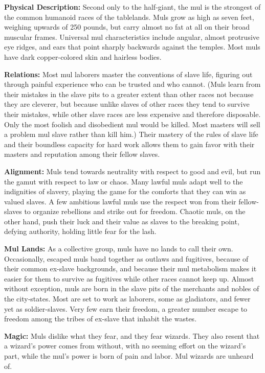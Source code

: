 \textbf{Physical Description:} Second only to the half‐giant, the mul is the strongest of the common humanoid races of the tablelands. Muls grow as high as seven feet, weighing upwards of 250 pounds, but carry almost no fat at all on their broad muscular frames. Universal mul characteristics include angular, almost protrusive eye ridges, and ears that point sharply backwards against the temples. Most muls have dark copper-colored skin and hairless bodies.

\textbf{Relations:} Most mul laborers master the conventions of slave life, figuring out through painful experience who can be trusted and who cannot. (Muls learn from their mistakes in the slave pits to a greater extent than other races not because they are cleverer, but because unlike slaves of other races they tend to survive their mistakes, while other slave races are less expensive and therefore disposable. Only the most foolish and disobedient mul would be killed. Most masters will sell a problem mul slave rather than kill him.) Their mastery of the rules of slave life and their boundless capacity for hard work allows them to gain favor with their masters and reputation among their fellow slaves.

\textbf{Alignment:} Muls tend towards neutrality with respect to good and evil, but run the gamut with respect to law or chaos. Many lawful muls adapt well to the indignities of slavery, playing the game for the comforts that they can win as valued slaves. A few ambitious lawful muls use the respect won from their fellow-slaves to organize rebellions and strike out for freedom. Chaotic muls, on the other hand, push their luck and their value as slaves to the breaking point, defying authority, holding little fear for the lash.

\textbf{Mul Lands:} As a collective group, muls have no lands to call their own. Occasionally, escaped muls band together as outlaws and fugitives, because of their common ex-slave backgrounds, and because their mul metabolism makes it easier for them to survive as fugitives while other races cannot keep up. Almost without exception, muls are born in the slave pits of the merchants and nobles of the city‐states. Most are set to work as laborers, some as gladiators, and fewer yet as soldier-slaves. Very few earn their freedom, a greater number escape to freedom among the tribes of ex-slave that inhabit the wastes.

\textbf{Magic:} Muls dislike what they fear, and they fear wizards. They also resent that a wizard's power comes from without, with no seeming effort on the wizard's part, while the mul's power is born of pain and labor. Mul wizards are unheard of.

